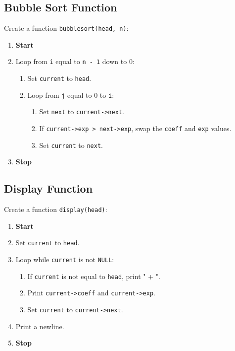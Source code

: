 {  \subsection{Bubble Sort Function}
  Create a function \texttt{bubblesort(head, n)}:
  \begin{enumerate}[label=\arabic*:,left=0pt]
    \item \textbf{Start}
    \item Loop from \texttt{i} equal to \texttt{n - 1} down to 0:
          \begin{enumerate}[label=2.\arabic*:, start=1]
            \item Set \texttt{current} to \texttt{head}.
            \item Loop from \texttt{j} equal to 0 to \texttt{i}:
                  \begin{enumerate}[label=2.2.\arabic*:, start=1]
                    \item Set \texttt{next} to \texttt{current->next}.
                    \item If \texttt{current->exp > next->exp}, swap the \texttt{coeff} and \texttt{exp} values.
                    \item Set \texttt{current} to \texttt{next}.
                  \end{enumerate}
          \end{enumerate}
    \item \textbf{Stop}
  \end{enumerate}

  \subsection{Display Function}
  Create a function \texttt{display(head)}:
  \begin{enumerate}[label=\arabic*:,left=0pt]
    \item \textbf{Start}
    \item Set \texttt{current} to \texttt{head}.
    \item Loop while \texttt{current} is not \texttt{NULL}:
          \begin{enumerate}[label=2.\arabic*:, start=1]
            \item If \texttt{current} is not equal to \texttt{head}, print " + ".
            \item Print \texttt{current->coeff} and \texttt{current->exp}.
            \item Set \texttt{current} to \texttt{current->next}.
          \end{enumerate}
    \item Print a newline.
    \item \textbf{Stop}
  \end{enumerate}

}
